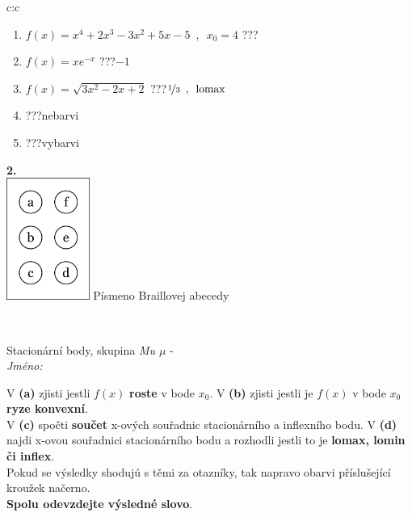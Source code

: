 \documentclass[10pt]{report}
\begin{document}
\begin{tabular}{c:c}
\begin{minipage}[c][104.5mm][t]{0.5\linewidth}
\begin{center}
\begin{minipage}{0.79\linewidth}
\begin{center}
\begin{varwidth}{\linewidth}
\begin{enumerate}
\item $f(x)=x^4+2x^3-3x^2+5x-5\enspace , \enspace x_0=4$\quad \dotfill\; ???\;\dotfill \quad {}
\item $f(x)=xe^{-x}$\quad \dotfill\; ???\;\dotfill \quad $-1$
\item $f(x)=\sqrt{3x^2-2x+2}$\quad \dotfill\; ???\;\dotfill \quad $\nicefrac{1}{3}\enspace , \enspace\mathrm{lomax}$
\item \quad \dotfill\; ???\;\dotfill \quad nebarvi
\item \quad \dotfill\; ???\;\dotfill \quad vybarvi
\end{enumerate}
\end{varwidth}
\end{center}
\end{minipage}
\begin{minipage}{0.20\linewidth}
\begin{center}
{\Huge\bfseries 2.} \\[2mm]
\includegraphics[height=40mm]{../images/braille.png}
{\small Písmeno Braillovej abecedy}
\end{center}
\end{minipage}
\end{center}
\end{minipage}
\\ \hdashline
\begin{minipage}[c][104.5mm][t]{0.5\linewidth}
\begin{center}
\vspace{7mm}
{\huge Stacionární body, skupina \textit{Mu $\mu$} -}\\[5mm]
\textit{Jméno:}\phantom{xxxxxxxxxxxxxxxxxxxxxxxxxxxxxxxxxxxxxxxxxxxxxxxxxxxxxxxxxxxxxxxxx}\\[5mm]
\begin{minipage}{0.95\linewidth}
\begin{center}
{\small V \textbf{(a)} zjisti jestli $f(x)$ \textbf{roste} v bode $x_0$. V \textbf{(b)} zjisti jestli je $f(x)$ v bode $x_0$ \textbf{ryze konvexní}.\\V \textbf{(c)} spočti \textbf{součet} x-ových souřadnic stacionárního a inflexního bodu. V \textbf{(d)} najdi x-ovou souřadnici stacionárního bodu a rozhodli jestli to je \textbf{lomax, lomin či inflex}.\\Pokud se výsledky shodujú s těmi za otazníky, tak napravo obarvi příslušející kroužek načerno.\\\textbf{Spolu odevzdejte výsledné slovo}}.

\end{center}
\end{minipage}
\end{center}
\end{minipage}
\end{tabular}
\end{document}
